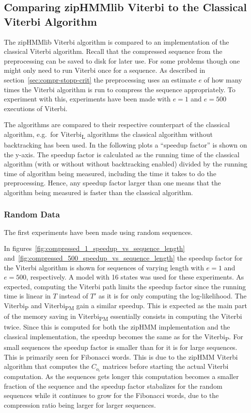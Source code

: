 \subsection{Comparing zipHMMlib Viterbi to the Classical Viterbi Algorithm}
\label{sec:comp-ziphmml-viterbi}

The zipHMMlib Viterbi algorithm is compared to an implementation of the
classical Viterbi algorithm. Recall that the compressed sequence from the
preprocessing can be saved to disk for later use. For some problems though one
might only need to run Viterbi once for a sequence. As described in
section~\ref{sec:compr-stopp-crit} the preprocessing uses an estimate $e$ of
how many times the Viterbi algorithm is run to compress the sequence
appropriately.  To experiment with this, experiments have been made with
$e = 1$ and $e = 500$ executions of Viterbi.

The algorithms are compared to their respective counterpart of the classical
algorithm, e.g.\ for Viterbi\textsubscript{L} algorithms the classical
algorithm without backtracking has been used. In the following plots a
``speedup factor'' is shown on the y-axis. The speedup factor is calculated as
the running time of the classical algorithm (with or without without backtracking
enabled) divided by the running time of algorithm being measured, including the
time it takes to do the preprocessing. Hence, any speedup factor larger than one
means that the algorithm being measured is faster than the classical algorithm.

\subsubsection{Random Data}

The first experiments have been made using random sequences.

In figures~\ref{fig:compressed_1_speedup_vs_sequence_length}
and~\ref{fig:compressed_500_speedup_vs_sequence_length} the speedup factor for
the Viterbi algorithm is shown for sequences of varying length with $e = 1$ and
$e = 500$, respectively. A model with 16 states was used for these experiments.
As expected, computing the Viterbi path limits the speedup factor since the
running time is linear in $T$ instead of $T'$ as it is for only computing the
log-likelihood. The Viterbi\textsubscript{P} and Viterbi\textsubscript{PM} gain
a similar speedup. This is expected as the main part of the memory saving in
Viterbi\textsubscript{PM} essentially consists in computing the Viterbi twice.
Since this is computed for both the zipHMM implementation and the classical
implementation, the speedup becomes the same as for the
Viterbi\textsubscript{P}. For small sequences the speedup factor is smaller
than for it is for large sequences. This is primarily seen for Fibonacci words.
This is due to the zipHMM Viterbi algorithm that computes the $C_{o_i}$ matrices
before starting the actual Viterbi computation. As the sequences gets longer
this computation becomes a smaller fraction of the sequence and the speedup
factor stabalizes for the random sequences while it continues to grow for the
Fibonacci words, due to the compression ratio being larger for larger sequences.

